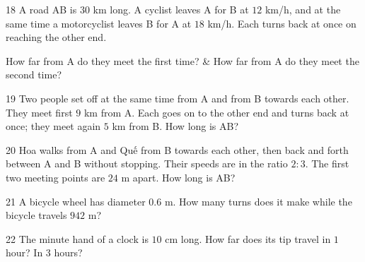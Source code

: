 \gap
\begin{probbox}{18}{\relax}
A road AB is $30$ km long. A cyclist leaves A for B at $12$ km/h, and at the same time a motorcyclist leaves B for A at $18$ km/h. Each turns back at once on reaching the other end.
\begin{cols2}
 How far from A do they meet the first time? &  How far from A do they meet the second time?
\end{cols2}
\end{probbox}
\gap
\begin{probbox}{19}{\relax}
Two people set off at the same time from A and from B towards each other. They meet first $9$ km from A. Each goes on to the other end and turns back at once; they meet again $5$ km from B. How long is AB?
\end{probbox}
\gap
\begin{probbox}{20}{\relax}
Hoa walks from A and Quế from B towards each other, then back and forth between A and B without stopping. Their speeds are in the ratio $2:3$. The first two meeting points are $24$ m apart. How long is AB?
\end{probbox}
\gap
\begin{probbox}{21}{\relax}
A bicycle wheel has diameter $0.6$ m. How many turns does it make while the bicycle travels $942$ m?
\end{probbox}
\gap
\begin{probbox}{22}{\relax}
The minute hand of a clock is $10$ cm long. How far does its tip travel in $1$ hour? In $3$ hours?
\end{probbox}
